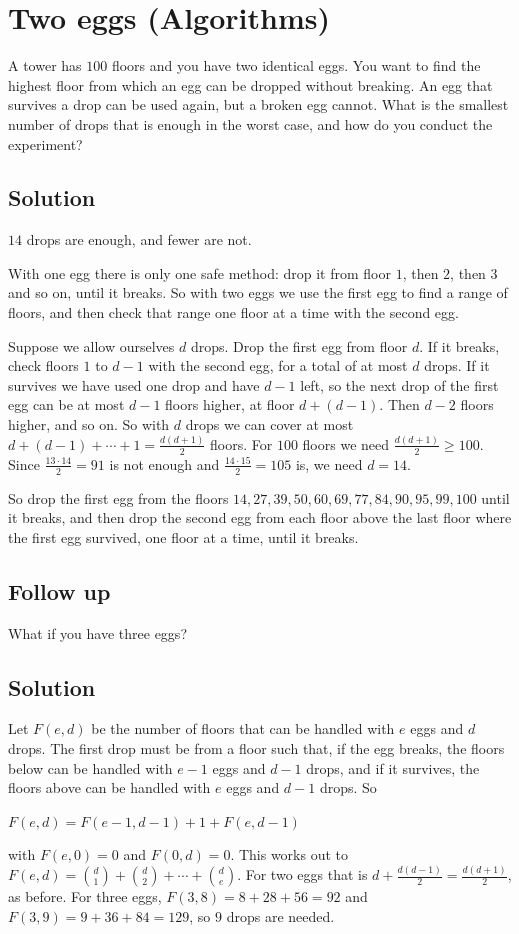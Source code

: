 \section {Two eggs (Algorithms)}

A tower has $100$ floors and you have two identical eggs. You want to find the highest floor from which an egg can be dropped without breaking.
An egg that survives a drop can be used again, but a broken egg cannot.
What is the smallest number of drops that is enough in the worst case, and how do you conduct the experiment?

\subsection{Solution}

$14$ drops are enough, and fewer are not.

With one egg there is only one safe method: drop it from floor $1$, then $2$, then $3$ and so on, until it breaks.
So with two eggs we use the first egg to find a range of floors, and then check that range one floor at a time with the second egg.

Suppose we allow ourselves $d$ drops. Drop the first egg from floor $d$. If it breaks, check floors $1$ to $d-1$ with the second egg,
for a total of at most $d$ drops. If it survives we have used one drop and have $d-1$ left, so the next drop of the first egg can be at most $d-1$ floors higher,
at floor $d + (d-1)$. Then $d-2$ floors higher, and so on.
So with $d$ drops we can cover at most $d + (d-1) + \cdots + 1 = \frac{d(d+1)}{2}$ floors.
For $100$ floors we need $\frac{d(d+1)}{2} \ge 100$. Since $\frac{13 \cdot 14}{2} = 91$ is not enough and $\frac{14 \cdot 15}{2} = 105$ is,
we need $d = 14$.

So drop the first egg from the floors $14, 27, 39, 50, 60, 69, 77, 84, 90, 95, 99, 100$ until it breaks,
and then drop the second egg from each floor above the last floor where the first egg survived, one floor at a time, until it breaks.

\subsection{Follow up}
What if you have three eggs?

\subsection{Solution}
Let $F(e,d)$ be the number of floors that can be handled with $e$ eggs and $d$ drops.
The first drop must be from a floor such that, if the egg breaks, the floors below can be handled with $e-1$ eggs and $d-1$ drops,
and if it survives, the floors above can be handled with $e$ eggs and $d-1$ drops. So
\begin{center}
$F(e,d) = F(e-1,d-1) + 1 + F(e,d-1)$
\end{center}
with $F(e,0) = 0$ and $F(0,d) = 0$. This works out to $F(e,d) = \binom{d}{1} + \binom{d}{2} + \cdots + \binom{d}{e}$.
For two eggs that is $d + \frac{d(d-1)}{2} = \frac{d(d+1)}{2}$, as before.
For three eggs, $F(3,8) = 8 + 28 + 56 = 92$ and $F(3,9) = 9 + 36 + 84 = 129$, so $9$ drops are needed.
